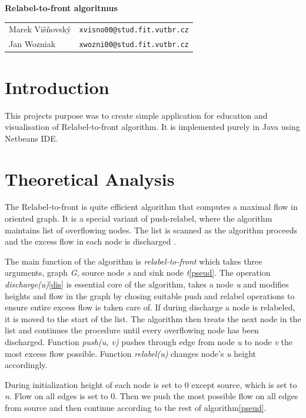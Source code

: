 \documentclass[a4paper,11pt]{article}
\begin{document}
\begin{center}{\LARGE\textbf{Relabel-to-front algoritmus}}\\[0.2cm]
\newcommand{\autor}[2]{#1&\texttt{#2@stud.fit.vutbr.cz}\tabularnewline}
\begin{tabular}{ll}
    \autor{Marek Višňovský}{xvisno00}
    \autor{Jan Wozniak}{xwozni00}
\end{tabular}
\end{center}

\section{Introduction}
This projects purpose was to create simple application for education and visualisation
of Relabel-to-front algorithm. It is implemented purely in Java using Netbeans
IDE.

\section{Theoretical Analysis}
The Relabel-to-front is quite efficient algorithm that computes a maximal flow in
oriented graph. It is a special variant of push-relabel, where the algorithm maintains
list of overflowing nodes. The list is scanned as the algorithm proceeds and the
excess flow in each node is discharged \cite{diz}. 

The main function of the algorithm is \textit{relabel-to-front} which takes three
arguments, graph \textit{G}, source node \textit{s} and sink node \textit{t}\ref{pseud}.
The operation \textit{discharge(u)}\ref{dis} is essential core of the algorithm, 
takes a node \textit{u} and modifies heights and flow in the graph by chosing
suitable push and relabel operations to ensure entire excess flow is taken care of.
If during discharge a node is relabeled, it is moved to the start of the list.
The algorithm then treats the next node in the list and continues the procedure
until every overflowing node has been discharged.
Function \textit{push(u, v)} pushes through edge from node \textit{u} to node
\textit{v} the most excess flow possible. Function \textit{relabel(u)} changes
node's \textit{u} height accordingly.

During initialization height of each node is set to 0 except source, which is set
to \textit{n}. Flow on all edges is set to 0. Then we push the most possible flow
on all edges from source and then continue according to the rest of algorithm\ref{pseud}.

\end{document}
